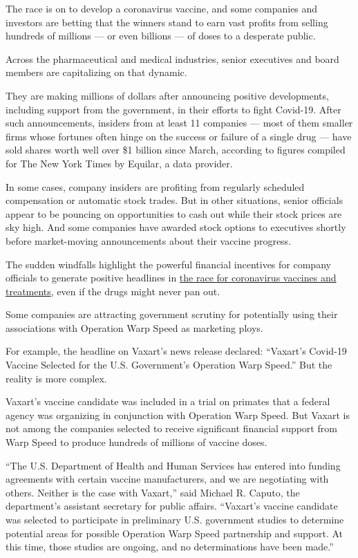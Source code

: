 The race is on to develop a coronavirus vaccine, and some companies and
investors are betting that the winners stand to earn vast profits from
selling hundreds of millions --- or even billions --- of doses to a
desperate public.

Across the pharmaceutical and medical industries, senior executives and
board members are capitalizing on that dynamic.

They are making millions of dollars after announcing positive
developments, including support from the government, in their efforts to
fight Covid-19. After such announcements, insiders from at least 11
companies --- most of them smaller firms whose fortunes often hinge on
the success or failure of a single drug --- have sold shares worth well
over \$1 billion since March, according to figures compiled for The New
York Times by Equilar, a data provider.

In some cases, company insiders are profiting from regularly scheduled
compensation or automatic stock trades. But in other situations, senior
officials appear to be pouncing on opportunities to cash out while their
stock prices are sky high. And some companies have awarded stock options
to executives shortly before market-moving announcements about their
vaccine progress.

The sudden windfalls highlight the powerful financial incentives for
company officials to generate positive headlines in
\href{https://www.nytimes3xbfgragh.onion/interactive/2020/science/coronavirus-vaccine-tracker.html}{the
race for coronavirus vaccines and treatments}, even if the drugs might
never pan out.

Some companies are attracting government scrutiny for potentially using
their associations with Operation Warp Speed as marketing ploys.

For example, the headline on Vaxart's news release declared: ``Vaxart's
Covid-19 Vaccine Selected for the U.S. Government's Operation Warp
Speed.'' But the reality is more complex.

Vaxart's vaccine candidate was included in a trial on primates that a
federal agency was organizing in conjunction with Operation Warp Speed.
But Vaxart is not among the companies selected to receive significant
financial support from Warp Speed to produce hundreds of millions of
vaccine doses.

``The U.S. Department of Health and Human Services has entered into
funding agreements with certain vaccine manufacturers, and we are
negotiating with others. Neither is the case with Vaxart,'' said Michael
R. Caputo, the department's assistant secretary for public affairs.
``Vaxart's vaccine candidate was selected to participate in preliminary
U.S. government studies to determine potential areas for possible
Operation Warp Speed partnership and support. At this time, those
studies are ongoing, and no determinations have been made.''

